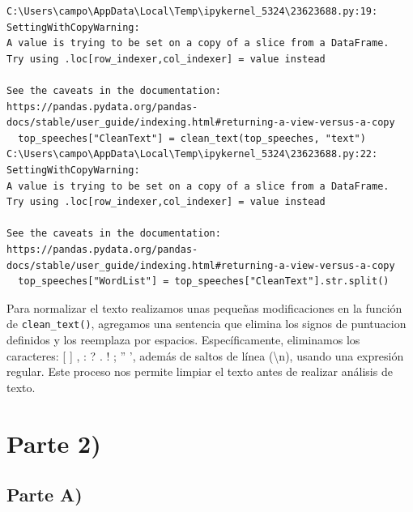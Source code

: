 \documentclass[
  letterpaper,
  DIV=11,
  numbers=noendperiod]{scrartcl}
\begin{document}
\begin{verbatim}
C:\Users\campo\AppData\Local\Temp\ipykernel_5324\23623688.py:19: SettingWithCopyWarning: 
A value is trying to be set on a copy of a slice from a DataFrame.
Try using .loc[row_indexer,col_indexer] = value instead

See the caveats in the documentation: https://pandas.pydata.org/pandas-docs/stable/user_guide/indexing.html#returning-a-view-versus-a-copy
  top_speeches["CleanText"] = clean_text(top_speeches, "text")
C:\Users\campo\AppData\Local\Temp\ipykernel_5324\23623688.py:22: SettingWithCopyWarning: 
A value is trying to be set on a copy of a slice from a DataFrame.
Try using .loc[row_indexer,col_indexer] = value instead

See the caveats in the documentation: https://pandas.pydata.org/pandas-docs/stable/user_guide/indexing.html#returning-a-view-versus-a-copy
  top_speeches["WordList"] = top_speeches["CleanText"].str.split()
\end{verbatim}

Para normalizar el texto realizamos unas pequeñas modificaciones en la
función de \texttt{clean_text()}, agregamos una sentencia que elimina
los signos de puntuacion definidos y los reemplaza por espacios.
Específicamente, eliminamos los caracteres: {[} {]} , : ? . ! ; '' ',
además de saltos de línea (\textbackslash n), usando una expresión
regular. Este proceso nos permite limpiar el texto antes de realizar
análisis de texto.

\section{Parte 2)}\label{parte-2}

\subsection{Parte A)}\label{parte-a}
\end{document}
